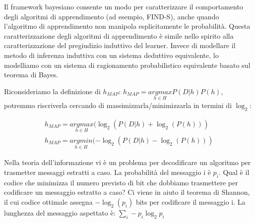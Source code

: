 \documentclass[a4paper]{extarticle}
\begin{document}
Il framework bayesiano consente un modo per caratterizzare il comportamento degli algoritmi di apprendimento (ad esempio, FIND-S), anche quando l'algoritmo di apprendimento non manipola esplicitamente le probabilità. Questa caratterizzazione degli algoritmi di apprendimento è simile nello spirito alla caratterizzazione del pregiudizio induttivo del learner. Invece di modellare il metodo di inferenza induttiva con un sistema deduttivo equivalente, lo modelliamo con un sistema di ragionamento probabilistico equivalente basato sul teorema di Bayes.

\begin{center}

\end{center}

Riconsideriamo la definizione di $h_{MAP}$: $h_{MAP} = \underset{h \in H}{argmax} P(D|h)P(h)$, potremmo riscriverla cercando di massimizzarla/minimizzarla in termini di $\log_2$:

\begin{equation*}
\begin{split}
h_{MAP} = \underset{h \in H}{argmax}(\log_2(P(D|h) + \log_2(P(h))) \\
h_{MAP} = \underset{h \in H}{argmin}(- \log_2(P(D|h) - \log_2(P(h)))
\end{split}
\end{equation*}

Nella teoria dell'informazione vi è un problema per decodificare un algoritmo per trasmetter messaggi estratti a caso. La probabilità del messaggio i è $p_i$. Qual è il codice che minimizza il numero previsto di bit che dobbiamo trasmettere per codificare un messaggio estratto a caso? Ci viene in aiuto il teorema di Shannon, il cui codice ottimale assegna $-\log_2(p_i)$ bits per codificare il messaggio i. La lunghezza del messaggio aspettato è: $\sum\limits_i -p_i \log_2 p_i$ 
\end{document}
